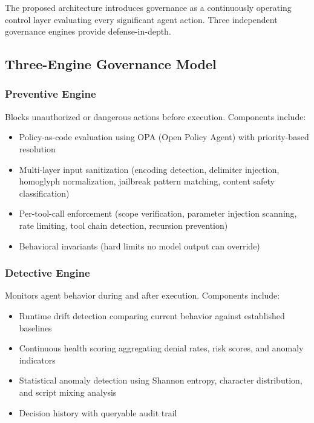\documentclass[conference]{IEEEtran}
\begin{document}
The proposed architecture introduces governance as a continuously operating control layer evaluating every significant agent action. Three independent governance engines provide defense-in-depth.

\subsection{Three-Engine Governance Model}

\subsubsection{Preventive Engine}

Blocks unauthorized or dangerous actions before execution. Components include:

\begin{itemize}
\item Policy-as-code evaluation using OPA (Open Policy Agent) with priority-based resolution
\item Multi-layer input sanitization (encoding detection, delimiter injection, homoglyph normalization, jailbreak pattern matching, content safety classification)
\item Per-tool-call enforcement (scope verification, parameter injection scanning, rate limiting, tool chain detection, recursion prevention)
\item Behavioral invariants (hard limits no model output can override)
\end{itemize}

\subsubsection{Detective Engine}

Monitors agent behavior during and after execution. Components include:

\begin{itemize}
\item Runtime drift detection comparing current behavior against established baselines
\item Continuous health scoring aggregating denial rates, risk scores, and anomaly indicators
\item Statistical anomaly detection using Shannon entropy, character distribution, and script mixing analysis
\item Decision history with queryable audit trail
\end{itemize}
\end{document}
